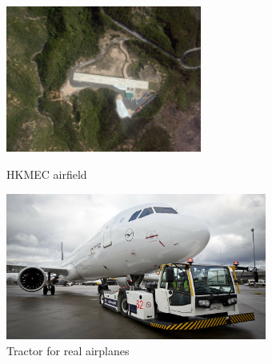 {\begin{figure}[h]
    \begin{minipage}{0.43\linewidth}
        \includegraphics[height=1.9in]{asset/airfield.jpg}
        \caption{HKMEC airfield}
        \label{HKMEC}
    \end{minipage}
    \begin{minipage}{0.56\linewidth}
        \includegraphics[height=1.9in]{asset/airplane.jpg}
        \caption{Tractor for real airplanes}
        \label{real_tractor}
    \end{minipage}
\end{figure}



}